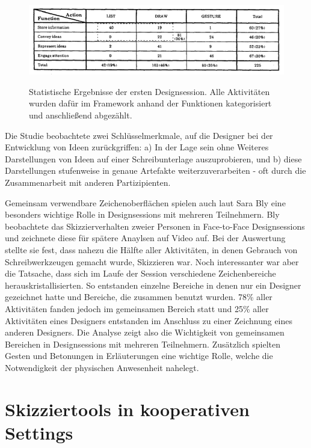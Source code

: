 \begin{figure}
        {\includegraphics[width=1\linewidth]{gfx/tangStatistik}}
		\caption[Statistische Ergebnisse der ersten Designsession \newline \citep{Tang:1988p279}]{Statistische Ergebnisse der ersten Designsession. Alle Aktivitäten wurden dafür im Framework anhand der Funktionen kategorisiert und anschließend abgezählt.}\label{fig:tangStatistik}
\end{figure}
\clearpage

\medskip Die Studie beobachtete zwei Schlüsselmerkmale, auf die Designer bei der Entwicklung von Ideen zurückgriffen: a) In der Lage sein ohne Weiteres Darstellungen von Ideen auf einer Schreibunterlage auszuprobieren, und b) diese Darstellungen stufenweise in genaue Artefakte weiterzuverarbeiten - oft durch die Zusammenarbeit mit anderen Partizipienten. \citep{Tang:1988p279}

\medskip Gemeinsam verwendbare Zeichenoberflächen spielen auch laut Sara Bly \citep{Bly:1988:UDS:62266.62286} eine besonders wichtige Rolle in Designsessions mit mehreren Teilnehmern. 
Bly beobachtete das Skizzierverhalten zweier Personen in Face-to-Face Designsessions und zeichnete diese für spätere Anaylsen auf Video auf. Bei der Auswertung stellte sie fest, dass nahezu die Hälfte aller Aktivitäten, in denen Gebrauch von Schreibwerkzeugen gemacht wurde, Skizzieren war. Noch interessanter war aber die Tatsache, dass sich im Laufe der Session verschiedene Zeichenbereiche herauskristallisierten. So entstanden einzelne Bereiche in denen nur ein Designer gezeichnet hatte und Bereiche, die zusammen benutzt wurden. 78\% aller Aktivitäten fanden jedoch im gemeinsamen Bereich statt und 25\% aller Aktivitäten eines Designers entstanden im Anschluss zu einer Zeichnung eines anderen Designers. Die Analyse zeigt also die Wichtigkeit von gemeinsamen Bereichen in Designsessions mit mehreren Teilnehmern. Zusätzlich spielten Gesten und Betonungen in Erläuterungen eine wichtige Rolle, welche die Notwendigkeit der physischen Anwesenheit nahelegt.

\section{Skizziertools in kooperativen Settings}

